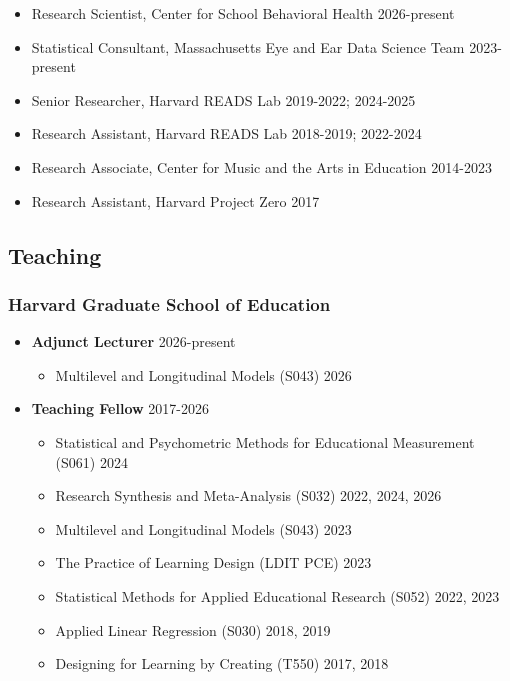 \documentclass[11pt]{article}
\begin{document}
\begin{itemize}
    \item Research Scientist, Center for School Behavioral Health \hfill 2026-present
    \item Statistical Consultant, Massachusetts Eye and Ear Data Science Team \hfill 2023-present
    \item Senior Researcher, Harvard READS Lab \hfill 2019-2022; 2024-2025
    \item Research Assistant, Harvard READS Lab \hfill 2018-2019; 2022-2024
    \item Research Associate, Center for Music and the Arts in Education \hfill 2014-2023
    \item Research Assistant, Harvard Project Zero \hfill 2017
\end{itemize}

\subsection{Teaching}

\subsubsection{Harvard Graduate School of Education}

\begin{itemize}
    \item \textbf{Adjunct Lecturer} \hfill 2026-present
    \begin{itemize}
        \item Multilevel and Longitudinal Models (S043) \hfill 2026
    \end{itemize}
\item \textbf{Teaching Fellow} \hfill 2017-2026
\begin{itemize}
    \item Statistical and Psychometric Methods for Educational Measurement (S061) \hfill 2024
    \item Research Synthesis and Meta-Analysis (S032) \hfill 2022, 2024, 2026
    \item Multilevel and Longitudinal Models (S043) \hfill 2023
    \item The Practice of Learning Design (LDIT PCE) \hfill 2023
    \item Statistical Methods for Applied Educational Research (S052) \hfill 2022, 2023
    \item Applied Linear Regression (S030) \hfill 2018, 2019
    \item Designing for Learning by Creating (T550) \hfill 2017, 2018
\end{itemize}
\end{itemize}
\end{document}

